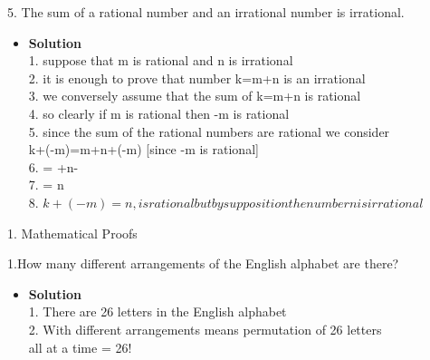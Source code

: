 \documentclass[11pt]{article}
\begin{document}
\begin{enumerate}

\begin{flushleft}
{\large 5. The sum of a rational number and an irrational number is irrational. }
\end{flushleft}

\begin{itemize}

\item \textbf{Solution}\\
\large 1. suppose that m is rational and n is irrational\\
\large 2. it is enough to prove that number k=m+n is an irrational\\
\large 3. we conversely assume that the sum of k=m+n is rational\\
\large 4. so clearly if m is rational then -m is rational\\
\large 5. since the sum of the rational numbers are rational we consider\\
k+(-m)=m+n+(-m) [since -m is rational]\\
\large 6. = +n-\\
\large 7. = n\\
\large 8. \therefore \hspace{.2cm} $k+(-m) = n, is rational but by supposition the number n is irrational$\\


\end {itemize}
\end {enumerate}






\begin{flushleft}
{\Large 1. Mathematical Proofs}
\end{flushleft}



\begin{enumerate}

\begin{flushleft}
{\large 1.How many different arrangements of the English alphabet are there?}
\end{flushleft}

\begin{itemize}

\item \textbf{Solution}\\
\large 1. There are 26 letters in the English alphabet\\
\large 2. With different arrangements means permutation of 26 letters\\
\large all at a time = 26!


\end {itemize}
\end {enumerate}
\end{document}
